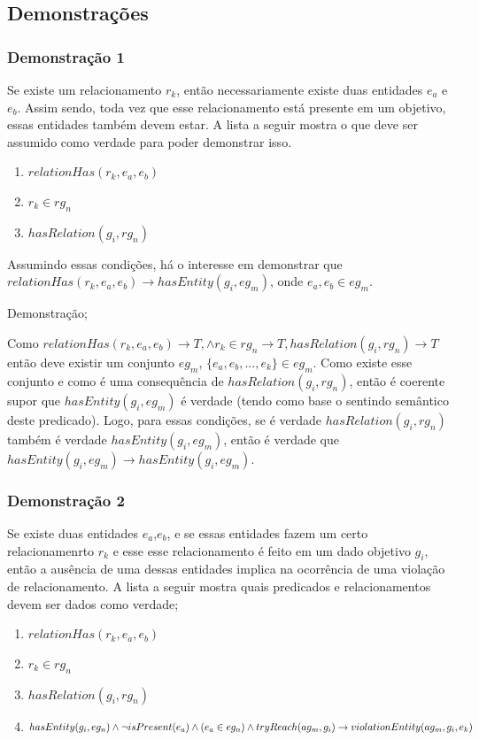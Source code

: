 \documentclass[12pt]{article}
\begin{document}
\subsection{Demonstrações}

\subsubsection{Demonstração 1}

Se existe um relacionamento $r_k$, então necessariamente existe duas entidades $e_a$ e $e_b$. Assim sendo, toda vez que esse relacionamento está presente em um objetivo, essas entidades também devem estar. A lista a seguir mostra o que deve ser assumido como verdade para poder demonstrar isso.


\begin{enumerate}
	\item $relationHas(r_k,e_a,e_b)$
	\item $r_k \in rg_n$
	\item $hasRelation(g_i,rg_n)$
\end{enumerate} 

Assumindo essas condições, há o interesse em demonstrar que $relationHas(r_k,e_a,e_b) \to  hasEntity(g_i,eg_m)$, onde $e_a,e_b \in eg_m$. 

Demonstração;

Como $relationHas(r_k,e_a,e_b) \to T, \wedge r_k \in rg_n \to T, hasRelation(g_i,rg_n) \to T$ então deve existir um conjunto $eg_m$, $\{e_a,e_b,...,e_k\} \in eg_m$. Como existe esse conjunto e como é uma consequência de $hasRelation(g_i,rg_n)$, então é coerente supor que $hasEntity(g_i,eg_m)$ é verdade (tendo como base o sentindo semântico deste predicado). Logo, para essas condições, se é verdade $hasRelation(g_i,rg_n)$ também é verdade $hasEntity(g_i,eg_m)$, então é verdade que $hasEntity(g_i,eg_m) \to hasEntity(g_i,eg_m)$.

\subsubsection{Demonstração 2}

Se existe duas entidades $e_a$,$e_b$, e se essas entidades fazem um certo relacionamenrto $r_k$ e esse esse relacionamento é feito em um dado objetivo $g_i$, então a ausência de uma dessas entidades implica na ocorrência de uma violação de relacionamento. A lista a seguir mostra quais predicados e relacionamentos devem ser dados como verdade; 

 \begin{enumerate}
	\item $relationHas(r_k,e_a,e_b)$
	\item $r_k \in rg_n$
	\item $hasRelation(g_i,rg_n)$
	\item $hasEntity(g_i,eg_n) \wedge \neg isPresent(e_a) 	\wedge (e_a \in eg_n) \wedge tryReach(ag_m,g_i) \to \nonumber \\ violationEntity(ag_m,g_i,e_k)$ 
\end{enumerate} 
\end{document}
